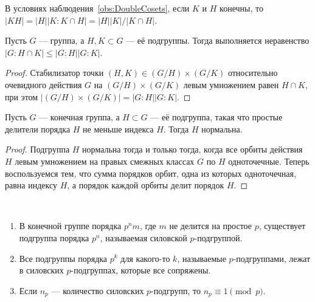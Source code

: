 \documentclass[
	extrafontsizes,
	11pt,
	hyphens,
]{memoir}
\begin{document}
\begin{corollary}
В условиях наблюдения~\ref{obs:DoubleCosets}, если \(K\) и \(H\) конечны, то \(\lvert KH \rvert = \lvert H \rvert \lvert K : K \cap H \rvert = \lvert H \rvert \lvert K \rvert / \lvert K \cap H \rvert\).
\end{corollary}

\begin{theorem}
Пусть \(G\) --- группа, а \(H,K \subset G\) --- её подгруппы.
Тогда выполняется неравенство \(\lvert G : H \cap K \rvert \leqslant
\lvert G : H \rvert \lvert G : K \rvert\).
\end{theorem}

\begin{proof}
Стабилизатор точки \((H,K) \in (G/H) \times (G/K)\) относительно очевидного действия \(G\) на \((G/H) \times (G/K)\) левым умножением равен \(H \cap K\),
при этом \(\lvert (G/H) \times (G/K) \rvert = \lvert G : H \rvert \lvert G : K \rvert\).
\end{proof}

\begin{theorem}
Пусть \(G\) --- конечная группа,
а \(H \subset G\) --- её подгруппа, такая что простые делители порядка \(H\) не меньше индекса \(H\).
Тогда \(H\) нормальна.
\end{theorem}

\begin{proof}
Подгруппа \(H\) нормальна тогда и только тогда, когда все орбиты действия \(H\) левым умножением на правых смежных классах \(G\) по \(H\) одноточечные.
Теперь воспользуемся тем, что
сумма порядков орбит, одна из которых одноточечная, равна индексу \(H\), а порядок каждой орбиты делит порядок \(H\).
\end{proof}

\begin{theorem}
~\begin{enumerate}[
	font=\upshape,
	label=\asbuk*),
	ref=\asbuk*,
	]

\item В конечной группе порядка \(p^n m\), где \(m\) не делится на простое \(p\), существует подгруппа порядка \(p^n\), называемая силовской \(p\)-подгруппой.

\item Все подгруппы порядка \(p^k\) для какого-то \(k\), называемые \(p\)-под\-груп\-пами, лежат в силовских \(p\)-подгруппах, которые все сопряжены.
    
\item Если \(n_p\) --- количество силовских \(p\)-подгрупп, то \(n_p \equiv 1 \pmod p\).

\end{enumerate}
\end{theorem}
\end{document}
